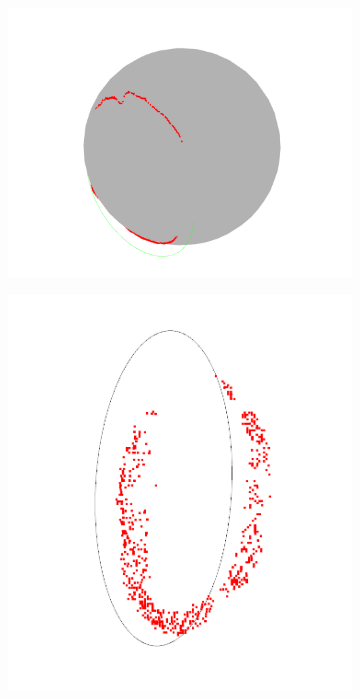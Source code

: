 \begin{figure}[ht]
\begin{subfigure}[t]{0.18\textwidth}
        \caption{}
        \label{fig:obb}
    \end{subfigure}\hfill
    \begin{subfigure}[t]{0.18\textwidth}
        \centering
        \includegraphics[width=\textwidth]{media/chapter 4/sphere.png}
        \caption{}
        \label{fig:sphere}
    \end{subfigure}\hfill
    \begin{subfigure}[t]{0.18\textwidth}
        \centering
        \includegraphics[width=\textwidth]{media/chapter 4/circl.png}

\end{subfigure}
\end{figure}
